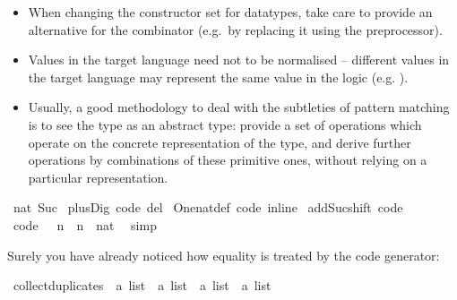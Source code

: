 \begin{isabellebody}
\begin{isamarkuptext}
  \begin{itemize}
    \item When changing the constructor set for datatypes, take care to
      provide an alternative for the  combinator (e.g.~by replacing
      it using the preprocessor).
    \item Values in the target language need not to be normalised -- different
      values in the target language may represent the same value in the
      logic (e.g. ).
    \item Usually, a good methodology to deal with the subtleties of pattern
      matching is to see the type as an abstract type: provide a set
      of operations which operate on the concrete representation of the type,
      and derive further operations by combinations of these primitive ones,
      without relying on a particular representation.
  \end{itemize}%
\end{isamarkuptext}%
\isamarkuptrue%
%
\isadeliminvisible
%
\endisadeliminvisible
%
\isataginvisible
{}\isamarkupfalse%
\ {\isachardoublequoteopen}{}{\isacharcolon}{\isacharcolon}nat{\isachardoublequoteclose}\ Suc\isanewline
{}\isamarkupfalse%
\ plus{\isacharunderscore}Dig\ {\isacharbrackleft}code\ del{\isacharbrackright}\isanewline
{}\isamarkupfalse%
\ One{\isacharunderscore}nat{\isacharunderscore}def\ {\isacharbrackleft}code\ inline{\isacharbrackright}\isanewline
{}\isamarkupfalse%
\ add{\isacharunderscore}Suc{\isacharunderscore}shift\ {\isacharbrackleft}code{\isacharbrackright}\ \isanewline
{}\isamarkupfalse%
\ {\isacharbrackleft}code{\isacharbrackright}{\isacharcolon}\ {\isachardoublequoteopen}{}\ {\isacharplus}\ n\ {\isacharequal}\ {\isacharparenleft}n\ {\isasymColon}\ nat{\isacharparenright}{\isachardoublequoteclose}\ \isamarkupfalse%
\ simp%
\endisataginvisible
{\isafoldinvisible}%
%
\isadeliminvisible
%
\endisadeliminvisible
%
\isamarkuptrue%
%
\begin{isamarkuptext}%
Surely you have already noticed how equality is treated
  by the code generator:%
\end{isamarkuptext}%
\isamarkuptrue%
%
\isadelimquote
%
\endisadelimquote
%
\isatagquote
{}\isamarkupfalse%
\ collect{\isacharunderscore}duplicates\ {\isacharcolon}{\isacharcolon}\ {\isachardoublequoteopen}{\isacharprime}a\ list\ {\isasymRightarrow}\ {\isacharprime}a\ list\ {\isasymRightarrow}\ {\isacharprime}a\ list\ {\isasymRightarrow}\ {\isacharprime}a\ list{\isachardoublequoteclose}\ \isanewline

\end{isabellebody}
